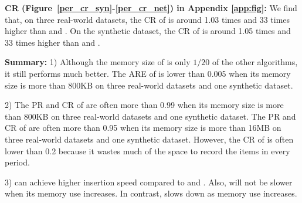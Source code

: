 \noindent\textbf{CR (Figure~\ref{per_cr_syn}-\ref{per_cr_net}) in Appendix \ref{app:fig}:}
We find that, on three real-world datasets, the CR of \sketchname{} is around 1.03 times and 33 times higher than \perss{} and \perpie. On the synthetic dataset, the CR of \sketchname{} is around 1.05 times and 33 times higher than \perss{} and \perpie.  

\noindent\textbf{Summary:}
%
1) Although the memory size of \sketchname{} is only $1/20$ of the other algorithms, it still performs much better. The ARE of \sketchname{} is lower than 0.005 when its memory size is more than 800KB on three real-world datasets and one synthetic dataset.

2) The PR and CR of \sketchname{} are often more than 0.99 when its memory size is more than 800KB on three real-world datasets and one synthetic dataset. The PR and CR of \perss{} are often more than 0.95 when its memory size is more than 16MB on three real-world datasets and one synthetic dataset. However, the CR of \perpie{} is often lower than 0.2 because it wastes much of the space to record the items in every period.

3) \sketchname{} can achieve higher insertion speed compared to \perss{} and \perpie. Also, \sketchname{} will not be slower when its memory use increases. In contrast, \perss{} slows down as memory use increases.